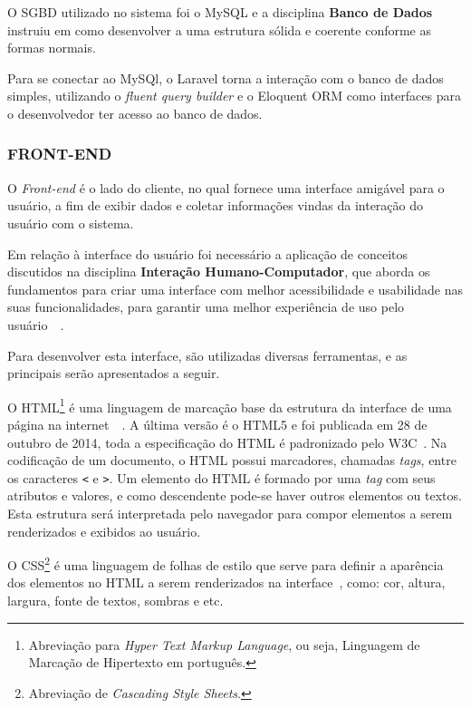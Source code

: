 \documentclass[
  12pt,				%
  openany,
  oneside,
  a4paper,			%
  english,			%
  brazil
]{article}
\numberwithin{figure}{section}
\numberwithin{table}{section}
\newcounter{subsubsubsection}[subsubsection]
\begin{document}
O SGBD utilizado no sistema foi o MySQL e a disciplina \textbf{Banco de Dados} instruiu em como desenvolver a uma estrutura sólida e coerente conforme as formas normais.

Para se conectar ao MySQl, o Laravel torna a interação com o banco de dados simples, utilizando o \textit{fluent query builder} e o Eloquent ORM como interfaces para o desenvolvedor ter acesso ao banco de dados.





\subsubsection{FRONT-END}
O \textit{Front-end} é o lado do cliente, no qual fornece uma interface amigável para o usuário, a fim de exibir dados e coletar informações vindas da interação do usuário com o sistema.

Em relação à interface do usuário foi necessário a aplicação de conceitos discutidos na disciplina \textbf{Interação Humano-Computador}, que aborda os fundamentos para criar uma interface com melhor acessibilidade e usabilidade nas suas funcionalidades, para garantir uma melhor experiência de uso pelo usuário~\cite{IHC_benyon}~\cite{IHC_preece}.

Para desenvolver esta interface, são utilizadas diversas ferramentas, e as principais serão apresentados a seguir.


O HTML\footnote{Abreviação para \textit{Hyper Text Markup Language}, ou seja, Linguagem de Marcação de Hipertexto em português.} é uma linguagem de marcação base da estrutura da interface de uma página na internet~\cite{Novatec_css_html}~\cite{PHP_Novatec_dev}. A última versão é o HTML5 e foi publicada em 28 de outubro de 2014, toda a especificação do HTML é padronizado pelo W3C~\cite{w3c}.
Na codificação de um documento, o HTML possui marcadores, chamadas \textit{tags}, entre os caracteres \texttt{<} e \texttt{>}. Um elemento do HTML é formado por uma \textit{tag} com seus atributos e valores, e como descendente pode-se haver outros elementos ou textos. Esta estrutura será interpretada pelo navegador para compor elementos a serem renderizados e exibidos ao usuário.




O CSS\footnote{Abreviação de \textit{Cascading Style Sheets}.} é uma linguagem de folhas de estilo que serve para definir a aparência dos elementos no HTML a serem renderizados na interface~\cite{Novatec_css_html}, como: cor, altura, largura, fonte de textos, sombras e etc.
\end{document}
